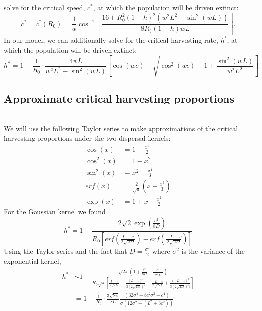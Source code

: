 \documentclass[12pt,english]{article}
\begin{document}
\citet{ZhouKot2011} solve for the critical speed, $c^*$, at which the population will be driven extinct:
$$c^*=c^*(R_0)=\frac{1}{w}\cos^{-1}\left[\frac{16+R_0^2(1-h)^2(w^2L^2-\sin^2(wL))}{8R_0(1-h)wL}\right].$$
In our model, we can additionally solve for the critical harvesting rate, $h^*$, at which the population will be driven extinct:
$$
h^*=1-\frac{1}{R_0}\cdot\frac{4wL}{w^2L^2-\sin^2(wL)}\left[\cos(wc)-\sqrt{\cos^2(wc)-1+\frac{\sin^2(wL)}{w^2L^2}}\right] 
$$

\subsection{Approximate critical harvesting proportions \label{approxcrit}}
~\\We will use the following Taylor series to make approximations of the critical harvesting proportions under the two dispersal kernels:
\begin{align*}
\cos(x)&=1-\frac{x^2}{2}
\\ \cos^2(x)&=1-x^2
\\ \sin^2(x)&=x^2-\frac{x^4}{3}
\\ erf(x)&=\frac{2}{\sqrt{\pi}}(x-\frac{x^3}{3})
\\ \exp(x)&=1+x+\frac{x^2}{2}
\end{align*}
For the Gaussian kernel we found 
\begin{equation}
h^*=1-\frac{2\sqrt{2}\exp\left(\frac{c^{2}}{8D}\right)}{R_0\left[erf\left(\frac{L-c}{2\sqrt{2D}}\right)-erf\left(\frac{-L-c}{2\sqrt{2D}}\right)\right]}
\end{equation} 
Using the Taylor series and the fact that $D=\frac{\sigma^2}{2}$ where $\sigma^2$ is the variance of the exponential kernel,
\begin{align*}
h^*&\sim 1-\frac{\sqrt{2\pi}(1+\frac{c^2}{8D}+\frac{c^4}{128D^2})}{R_0\sqrt{\pi}\left[\frac{L-c}{2\sqrt{2D}}-\frac{(L-c)^3}{3(2\sqrt{2D})^3}-\frac{-L-c}{2\sqrt{2D}}+\frac{(-L-c)^3}{3(2\sqrt{2D})^3)}\right]}
\\&= 1-\frac{1}{R_0}\cdot\frac{3\sqrt{2\pi}}{8L}\frac{(32\sigma^4+8c^2\sigma^2+c^4)}{\sigma\left(12\sigma^2-(L^2+3c^2)\right)}
\end{align*}
\end{document}
